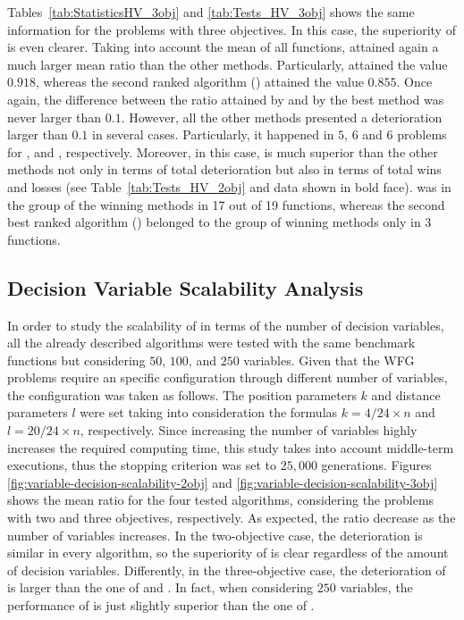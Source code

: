 Tables~\ref{tab:StatisticsHV_3obj} and \ref{tab:Tests_HV_3obj} shows the same information for the problems with three objectives.
%
In this case, the superiority of \VSDMOEA{} is even clearer.
%
Taking into account the mean of all functions, \VSDMOEA{} attained again a much larger mean \HV{} ratio than the other methods.
%
Particularly, \VSDMOEA{} attained the value $0.918$, whereas the second ranked algorithm (\RMOEA{}) attained the value $0.855$.
%
Once again, the difference between the \HV{} ratio attained by \VSDMOEA{} and by the best method was never larger
than $0.1$.
%
However, all the other methods presented a deterioration larger than $0.1$ in several cases.
%
Particularly, it happened in $5$, $6$ and $6$ problems for \RMOEA{}, \NSGAII{} and \MOEAD{}, respectively.
%
Moreover, in this case, \VSDMOEA{} is much superior than the other methods not only in terms of total deterioration but also
in terms of total wins and losses  (see Table~\ref{tab:Tests_HV_2obj} and data shown in bold face).
%
\VSDMOEA{} was in the group of the winning methods in 17 out of 19 functions, whereas the second best ranked algorithm (\RMOEA{})
belonged to the group of winning methods only in 3 functions.

\subsection{Decision Variable Scalability Analysis}

In order to study the scalability of \VSDMOEA{} in terms of the number of decision variables, all the already described algorithms were tested with
the same benchmark functions but considering $50$, $100$, and $250$ variables.
%
Given that the WFG problems require an specific configuration through different number of variables, the configuration was taken as follows.
%
The position parameters $k$ and distance parameters $l$ were set taking into consideration the formulas $k=4/24  \times n$ and $l= 20/24  \times n$, respectively.
%
Since increasing the number of variables highly increases the required computing time, this study takes into account middle-term executions, thus the stopping criterion was set to $25,000$ generations.
%
Figures \ref{fig:variable-decision-scalability-2obj} and \ref{fig:variable-decision-scalability-3obj} shows the mean \HV{} ratio for the four tested algorithms,
considering the problems with two and three objectives, respectively.
%
As expected, the \HV{} ratio decrease as the number of variables increases.
%
In the two-objective case, the deterioration is similar in every algorithm, so the superiority of \VSDMOEA{} is clear regardless of the amount of decision
variables.
%
Differently, in the three-objective case, the deterioration of \VSDMOEA{} is larger than the one of \RMOEA{} and \MOEAD{}.
%
In fact, when considering $250$ variables, the performance of \VSDMOEA{} is just slightly superior than the one of \RMOEA{}.



